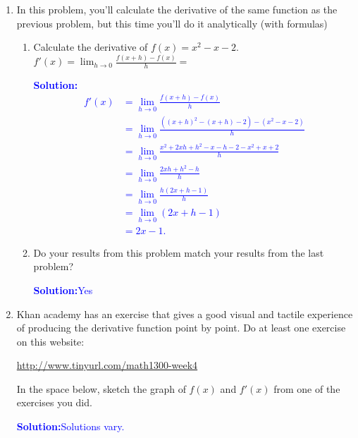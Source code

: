 \documentclass[letterpaper,11pt]{article}
\newcommand{\sol}[2]{\begin{minipage}[c][#1]{\linewidth}{\textcolor{blue}{\textbf{Solution:}}\quad \textcolor{blue}{#2}}\end{minipage}}
\newcommand{\sol}[2]{\begin{minipage}[c][#1]{\linewidth}{\vfill}\end{minipage}}
\begin{document}
\begin{enumerate}
\begin{enumerate}
\begin{center}
\begin{tikzpicture}
\end{tikzpicture}
\end{center}
\item What do you think the formula for this graph is?

\sol{.2 in}{It's a straight line with slope $2$ and $y$-intercept $(0, -1)$, so $y=2x-1$}

\newpage
\end{enumerate}

\item In this problem, you'll calculate the derivative of the same function as the previous problem, but this time you'll do it analytically (with formulas)
\begin{enumerate}

\item  Calculate the derivative of $f(x) = x^2 -x - 2$.\\
$\displaystyle f'(x) = \lim_{h\rightarrow 0}\frac{f(x+h)-f(x)}{h}=$


\sol{3 in}{
\begin{align*}
f'(x) &= \lim_{h\to 0} \frac{f(x+h)-f(x)}{h} \\
&= \lim_{h\to 0} \frac{( (x+h)^2 - (x+h)-2) - (x^2 -x - 2)}{h} \\
&= \lim_{h\to 0} \frac{x^2+2xh+h^2-x-h-2-x^2+x+2}{h} \\
&= \lim_{h\to 0} \frac{2xh+h^2-h}{h} \\
&= \lim_{h\to 0} \frac{h(2x+h-1)}{h} \\
&= \lim_{h\to 0} (2x+h-1)\\
&= 2x-1.
\end{align*}
}

\item  Do your results from this problem match your results from the last problem?

\sol{.3 in}{Yes}
\end{enumerate}

\item Khan academy has an exercise that gives a good visual and tactile experience of producing the derivative function point by point.  Do at least one exercise on this website:
\begin{sloppypar}
\url{http://www.tinyurl.com/math1300-week4}
\end{sloppypar}
In the space below, sketch the graph of $f(x)$ and $f'(x)$ from one of the exercises you did.
\sol{1in}{Solutions vary.}



\end{enumerate}
\end{document}
